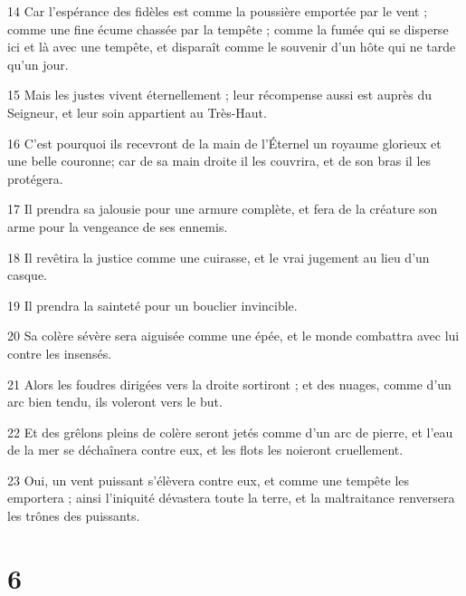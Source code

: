 \par 14 Car l'espérance des fidèles est comme la poussière emportée par le vent ; comme une fine écume chassée par la tempête ; comme la fumée qui se disperse ici et là avec une tempête, et disparaît comme le souvenir d'un hôte qui ne tarde qu'un jour.
\par 15 Mais les justes vivent éternellement ; leur récompense aussi est auprès du Seigneur, et leur soin appartient au Très-Haut.
\par 16 C'est pourquoi ils recevront de la main de l'Éternel un royaume glorieux et une belle couronne; car de sa main droite il les couvrira, et de son bras il les protégera.
\par 17 Il prendra sa jalousie pour une armure complète, et fera de la créature son arme pour la vengeance de ses ennemis.
\par 18 Il revêtira la justice comme une cuirasse, et le vrai jugement au lieu d'un casque.
\par 19 Il prendra la sainteté pour un bouclier invincible.
\par 20 Sa colère sévère sera aiguisée comme une épée, et le monde combattra avec lui contre les insensés.
\par 21 Alors les foudres dirigées vers la droite sortiront ; et des nuages, comme d'un arc bien tendu, ils voleront vers le but.
\par 22 Et des grêlons pleins de colère seront jetés comme d'un arc de pierre, et l'eau de la mer se déchaînera contre eux, et les flots les noieront cruellement.
\par 23 Oui, un vent puissant s'élèvera contre eux, et comme une tempête les emportera ; ainsi l'iniquité dévastera toute la terre, et la maltraitance renversera les trônes des puissants.

\chapter{6}

